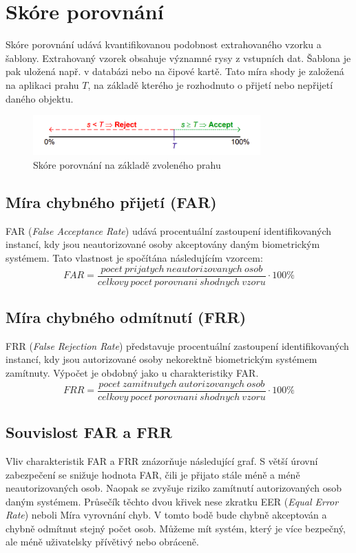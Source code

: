 \section{Skóre porovnání}
Skóre porovnání udává kvantifikovanou podobnost extrahovaného vzorku a šablony. Extrahovaný vzorek obsahuje významné rysy z vstupních dat. Šablona je pak uložená např. v databázi nebo na čipové kartě. Tato míra shody je založená na aplikaci prahu $T$, na základě kterého je rozhodnuto o přijetí nebo nepřijetí daného objektu. \cite{Drahansky}

\begin{figure}[!htbp]
    \centering
    \includegraphics[width=330px]{obrazky-figures/mira.png}
    \caption{Skóre porovnání na základě zvoleného prahu \cite{Drahansky}}
\end{figure}

\subsection*{Míra chybného přijetí (FAR)}
FAR (\textit{False Acceptance Rate}) udává procentuální zastoupení identifikovaných instancí, kdy jsou neautorizované osoby akceptovány daným biometrickým systémem. Tato vlastnost je spočítána následujícím vzorcem:
$$FAR = \frac{pocet\:prijatych\:neautorizovanych\:osob}{celkovy\:pocet\:porovnani\:shodnych\:vzoru} \cdot 100 \%$$

\subsection*{Míra chybného odmítnutí (FRR)}
FRR (\textit{False Rejection Rate}) představuje procentuální zastoupení identifikovaných instancí, kdy jsou autorizované osoby nekorektně biometrickým systémem zamítnuty. Výpočet je obdobný jako u charakteristiky FAR.
$$FRR = \frac{pocet\:zamitnutych\:autorizovanych\:osob}{celkovy\:pocet\:porovnani\:shodnych\:vzoru} \cdot 100 \%$$

\subsection*{Souvislost FAR a FRR}
Vliv charakteristik FAR a FRR znázorňuje následující graf. S větší úrovní zabezpečení se snižuje hodnota FAR, čili je přijato stále méně a méně neautorizovaných osob. Naopak se zvyšuje riziko zamítnutí autorizovaných osob daným systémem. Průsečík těchto dvou křivek nese zkratku EER (\textit{Equal Error Rate}) neboli Míra vyrovnání chyb. V tomto bodě bude chybně akceptován a chybně odmítnut stejný počet osob. Můžeme mít systém, který je více bezpečný, ale méně uživatelsky přívětivý nebo obráceně. \cite{FARFRR}


